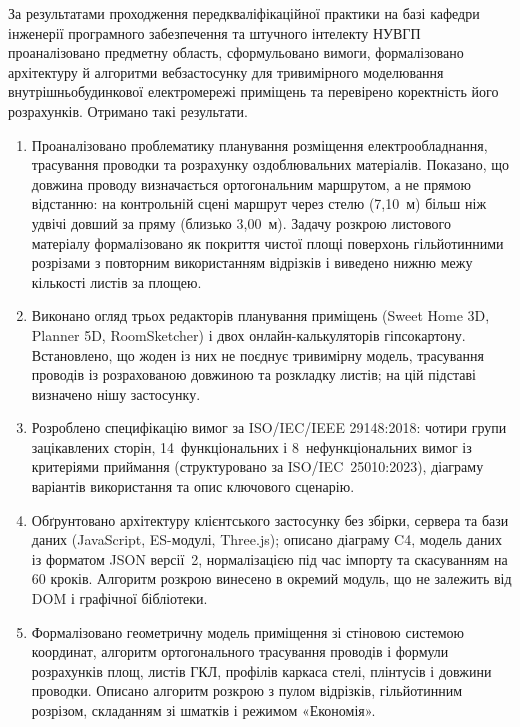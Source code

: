 
За результатами проходження передкваліфікаційної практики на базі кафедри інженерії програмного забезпечення та штучного інтелекту НУВГП проаналізовано предметну область, сформульовано вимоги, формалізовано архітектуру й алгоритми вебзастосунку для тривимірного моделювання внутрішньобудинкової електромережі приміщень та перевірено коректність його розрахунків. Отримано такі результати.

\begin{enumerate}[noitemsep, topsep=0.3em, leftmargin=*, label=\arabic*.]
    \item Проаналізовано проблематику планування розміщення електрообладнання, трасування проводки та розрахунку оздоблювальних матеріалів. Показано, що довжина проводу визначається ортогональним маршрутом, а не прямою відстанню: на контрольній сцені маршрут через стелю (7,10~м) більш ніж удвічі довший за пряму (близько 3,00~м). Задачу розкрою листового матеріалу формалізовано як покриття чистої площі поверхонь гільйотинними розрізами з повторним використанням відрізків і виведено нижню межу кількості листів за площею.

    \item Виконано огляд трьох редакторів планування приміщень (Sweet Home 3D, Planner 5D, RoomSketcher) і двох онлайн-калькуляторів гіпсокартону. Встановлено, що жоден із них не поєднує тривимірну модель, трасування проводів із розрахованою довжиною та розкладку листів; на цій підставі визначено нішу застосунку.

    \item Розроблено специфікацію вимог за ISO/IEC/IEEE 29148:2018: чотири групи зацікавлених сторін, 14~функціональних і 8~нефункціональних вимог із критеріями приймання (структуровано за ISO/IEC~25010:2023), діаграму варіантів використання та опис ключового сценарію.

    \item Обґрунтовано архітектуру клієнтського застосунку без збірки, сервера та бази даних (JavaScript, ES-модулі, Three.js); описано діаграму C4, модель даних із форматом JSON версії~2, нормалізацією під час імпорту та скасуванням на 60 кроків. Алгоритм розкрою винесено в окремий модуль, що не залежить від DOM і графічної бібліотеки.

    \item Формалізовано геометричну модель приміщення зі стіновою системою координат, алгоритм ортогонального трасування проводів і формули розрахунків площ, листів ГКЛ, профілів каркаса стелі, плінтусів і довжини проводки. Описано алгоритм розкрою з пулом відрізків, гільйотинним розрізом, складанням зі шматків і режимом «Економія».


\end{enumerate}
